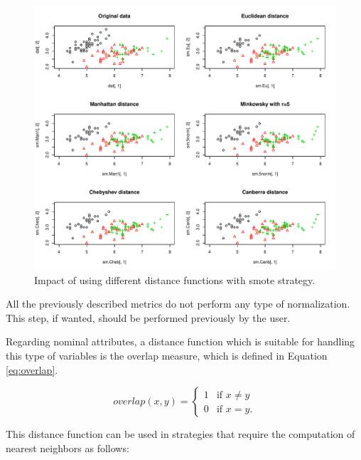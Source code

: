 \documentclass[10pt,a4paper]{article}\usepackage[]{graphicx}\usepackage[]{color}
\makeatletter
\def\maxwidth{ %
  \ifdim\Gin@nat@width>\linewidth
    \linewidth
  \else
    \Gin@nat@width
  \fi
}
\newenvironment{knitrout}{}{} %
\makeatother
\begin{document}
\begin{knitrout}\footnotesize
{}\color{fgcolor}\begin{figure}

{\centering \includegraphics[width=\maxwidth]{figures/UBL-dist_num-1} 

}

\caption[Impact of using different distance functions with smote strategy]{Impact of using different distance functions with smote strategy.}\label{fig:dist_num}
\end{figure}


\end{knitrout}

All the previously described metrics do not perform any type of normalization. This step, if wanted, should be performed previously by the user.


Regarding nominal attributes, a distance function which is suitable for handling this type of variables is the overlap measure, which is defined in Equation \ref{eq:overlap}.


\begin{equation}\label{eq:overlap}
overlap(x,y) = \begin{cases} 1 &\mbox{if } x \neq y \\
0 & \mbox{if } x = y. \end{cases} 
\end{equation}

This distance function can be used in strategies that require the computation of nearest neighbors as follows:
\end{document}
